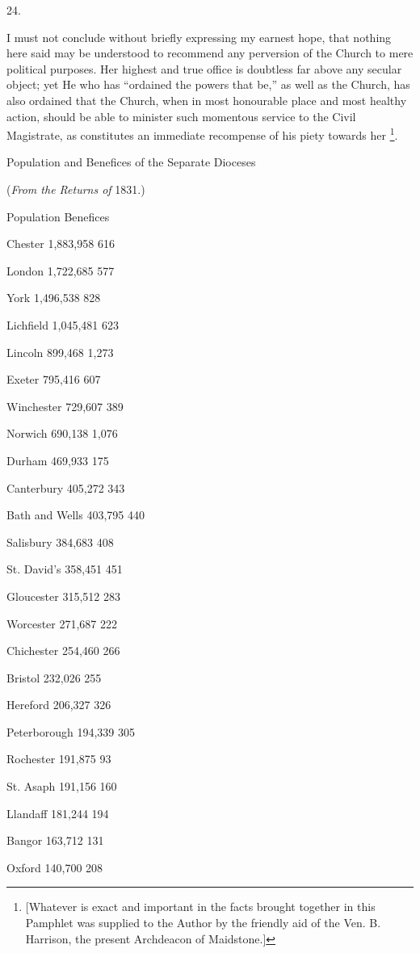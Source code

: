 24.

I must not conclude without briefly expressing my
earnest hope, that nothing here said may be understood to recommend
any perversion of the Church to mere political purposes. Her highest
and true office is doubtless far above any secular object; yet He who
has ``ordained the powers that be,'' as well as the Church, has
also ordained that the Church, when in most honourable place and most
healthy action, should be able to minister such momentous service to
the Civil Magistrate, as constitutes an immediate recompense of his
piety towards her \footnote{[Whatever is exact and important in the facts brought together in this
Pamphlet was supplied to the Author by the friendly aid of the Ven. B.
Harrison, the present Archdeacon of Maidstone.]}.


Population and Benefices of the
Separate Dioceses

(\emph{From the Returns of} 1831.)

Population
Benefices

Chester
1,883,958
616

London
1,722,685
577

York
1,496,538
828

Lichfield
1,045,481
623

Lincoln
899,468
1,273

Exeter
795,416
607

Winchester
729,607
389

Norwich
690,138
1,076

Durham
469,933
175

Canterbury
405,272
343

Bath and Wells
403,795
440

Salisbury
384,683
408

St. David's
358,451
451

Gloucester
315,512
283

Worcester
271,687
222

Chichester
254,460
266

Bristol
232,026
255

Hereford
206,327
326

Peterborough
194,339
305

Rochester
191,875
93

St. Asaph
191,156
160

Llandaff
181,244
194

Bangor
163,712
131

Oxford
140,700
208

